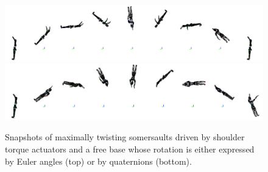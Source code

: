 \begin{figure}[t!]
\centering
\includegraphics[width=\textwidth]{figures/Euler_Bioptim_MaxVrille_dos.png}\\
\vspace*{0.5em}
\includegraphics[width=\textwidth]{figures/Quat_Bioptim_MaxVrille_dos.png}
\caption{Snapshots of maximally twisting somersaults driven by shoulder torque actuators and a free base whose rotation is either expressed by Euler angles (top) or by quaternions (bottom).}
\label{fig:snapshots_quaternion_base_twisting_somersault}
\end{figure}















